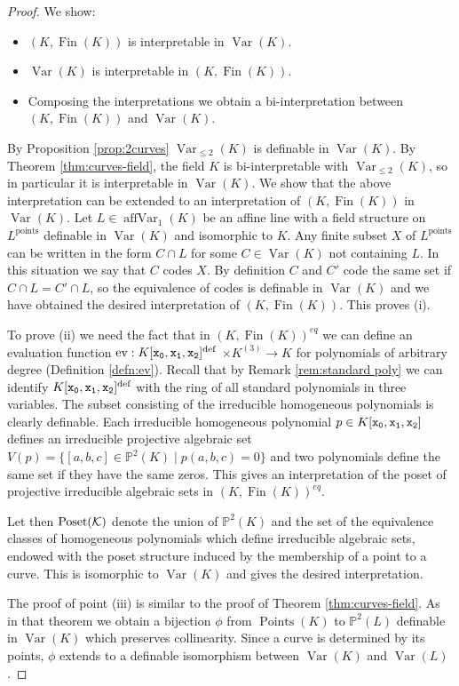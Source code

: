 \documentclass{amsart}
\newcommand{\Fin}{\operatorname{Fin}}
\theoremstyle{plain}
\theoremstyle{definition}
\newcommand{\ev}{\textnormal{ev}}
\newcommand{\Var}[1]{\operatorname{Var}(#1)}
\newcommand{\nVar}[2]{\operatorname{Var}_{#2} (#1)}
\newcommand{\Points}[1]{\operatorname{Points} (#1)}
\newcommand{\pt}[1]{{#1}^{\text{points}}}
\newcommand{\naffVar}[2]{\operatorname{affVar}_{#2}(#1)}
\begin{document}
\begin{proof}
We show: 
\begin{itemize}
\item[(i)] $(K, \Fin(K))$ is interpretable in $\Var K$. 
\item[(ii)] $\Var K$ is interpretable in $(K, \Fin(K))$. 
\item[(iii)] Composing the interpretations we obtain a bi-interpretation between $(K, \Fin(K))$ and $\Var K$. 
\end{itemize}
 By Proposition \ref{prop:2curves} $\nVar K {\leq 2}$ is definable in $\Var K$.
 By Theorem \ref{thm:curves-field}, the field $K$ is bi-interpretable with $\nVar K {\leq 2}$, so in particular it is interpretable in $\Var K$. 
 We show that the above interpretation can be extended to an interpretation of $(K, \Fin(K))$ in $\Var K$. 
 Let $L\in \naffVar K 1$ be an affine line with a field structure on $L^{\text{points}}$ definable in $\Var K$ and isomorphic to $K$.  Any finite subset $X$ of $\pt L$ can be written in the form $C \cap L$ for some $C\in \Var K$ not containing $L$. 
In this situation we say that $C$ codes $X$. By definition $C$ and $C'$ code the same set if $C\cap L = C'\cap L$, so the equivalence of codes is definable in $\Var K$ and we have obtained the desired interpretation of $(K, \Fin(K))$. This proves (i). 

\smallskip 
To prove (ii) we need the fact that in $(K, \Fin(K))^{eq}$ we can define an evaluation function $\ev: K[\tt{x_0, x_1, x_2}]^{\text{def}}$ $\times K^{(3)}\to K$ for polynomials of arbitrary degree (Definition \ref{defn:ev}). Recall that by Remark \ref{rem:standard poly} we can identify $K[\tt{x_0, x_1, x_2}]^{\text{def}}$ with the ring of all standard polynomials in three variables. The subset consisting of the irreducible homogeneous polynomials is clearly definable. Each irreducible homogeneous polynomial $p\in K[{\tt x_0, x_1, x_2}]$ defines an irreducible projective algebraic set $V(p) = \{[a,b,c]\in \mathbb P^2(K)  \mid p(a,b,c) = 0\}$ and two polynomials define the same set if they have the same zeros. This gives an interpretation of the poset of projective irreducible algebraic sets in $(K, \Fin(K))^{eq}$. 

Let then $\textnormal{Poset}(\mathcal{K})$ denote the union of $\mathbb{P}^2(K)$ and the set of the equivalence classes of homogeneous polynomials which define irreducible algebraic sets, endowed with the poset structure induced by the membership of a point to a curve. This is isomorphic to $\Var{K}$ and gives the desired interpretation. 
\smallskip 

The proof of point (iii) is similar to the proof of Theorem \ref{thm:curves-field}. As in that theorem we obtain a bijection $\phi$ from $\Points K$ to $\mathbb{P}^2(L)$ definable in $\Var K$ which preserves collinearity. Since a curve is determined by its points, $\phi$ extends to a definable isomorphism between $\Var K$ and $\Var L$.
\end{proof}	
\end{document}
